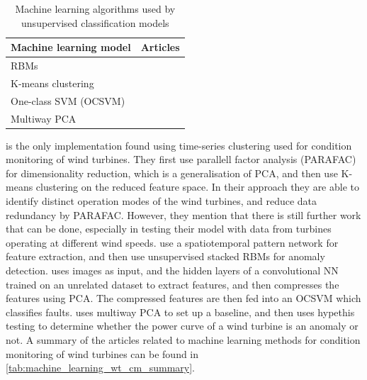 \begin{table}[h]
    \centering
    \begin{tabular}{p{}p{}}
        \toprule
        Machine learning model & Articles \\
        \midrule
        RBMs                    & \cite{unsup_graphical_modeling_wt_cm} \\
        K-means clustering      & \cite{fault_detect_PARAFAC_k_means} \\
        One-class SVM (OCSVM)   & \cite{unsupervised_AD_blade_damage_deep_features_images} \\
        Multiway PCA            & \cite{multiway_PCA_multivar_inference_cm_wt} \\
        \bottomrule
    \end{tabular}
    \caption{Machine learning algorithms used by unsupervised classification models}
    \label{tab:sup_classification_ml_models}
\end{table}

\textcite{fault_detect_PARAFAC_k_means} is the only implementation found using time-series clustering used for condition monitoring of wind turbines. 
They first use parallell factor analysis (PARAFAC) for dimensionality reduction, which is a generalisation of PCA, and then use K-means clustering on the reduced feature space. 
In their approach they are able to identify distinct operation modes of the wind turbines, and reduce data redundancy by PARAFAC. 
However, they mention that there is still further work that can be done, especially in testing their model with data from turbines operating at different wind speeds. 
\textcite{unsup_graphical_modeling_wt_cm} use a spatiotemporal pattern network for feature extraction, and then use unsupervised stacked RBMs for anomaly detection. 
\textcite{unsupervised_AD_blade_damage_deep_features_images} uses images as input, and the hidden layers of a convolutional NN trained on an unrelated dataset to extract features, and then compresses the features using PCA. 
The compressed features are then fed into an OCSVM which classifies faults. 
\textcite{multiway_PCA_multivar_inference_cm_wt} uses multiway PCA to set up a baseline, and then uses hypethis testing to determine whether the power curve of a wind turbine is an anomaly or not. 
A summary of the articles related to machine learning methods for condition monitoring of wind turbines can be found in \ref{tab:machine_learning_wt_cm_summary}.

